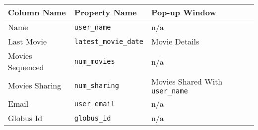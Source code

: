 \begin{tabularx}{\textwidth}{l|l|X}
\toprule
 Column Name      & Property Name     & Pop-up Window                \\
\midrule
 Name             & \texttt{user\_name}         & n/a                          \\
 Last Movie       & \texttt{latest\_movie\_date} & Movie Details                \\
 Movies Sequenced & \texttt{num\_movies}        & n/a                          \\
 Movies Sharing   & \texttt{num\_sharing}       & Movies Shared With \texttt{user\_name} \\
 Email            & \texttt{user\_email}        & n/a                          \\
 Globus Id        & \texttt{globus\_id}         & n/a                          \\
\bottomrule
\end{tabularx}